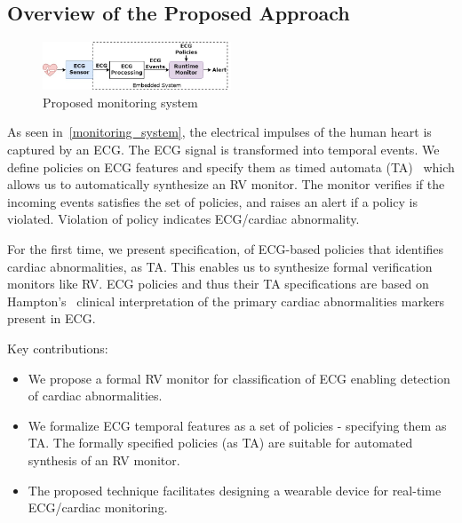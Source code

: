 \subsection{Overview of the Proposed Approach}

\begin{figure}
	\centering
	\includegraphics[width=0.5\textwidth]{Images/overview} 
	\caption{Proposed monitoring system}
	\label{monitoring_system}
\end{figure}


As seen in~\autoref{monitoring_system}, the electrical impulses of the human heart is captured by an ECG. The ECG signal is transformed into temporal events. We define policies on ECG features and specify them as timed automata (TA)~\cite{alur1994theory} which allows us to automatically synthesize an RV monitor. The monitor verifies if the incoming events satisfies the set of policies, and raises an alert if a policy is violated. Violation of policy indicates ECG/cardiac abnormality.

For the first time, we present specification, of ECG-based policies that identifies cardiac abnormalities, as TA. This enables us to synthesize formal verification monitors like RV. ECG policies and thus their TA specifications are based on Hampton's~\cite{hampton2019ecg} clinical interpretation of the primary cardiac abnormalities markers present in ECG.


Key contributions:
\begin{itemize}
	\item We propose a formal RV monitor for classification of ECG
	enabling detection of cardiac abnormalities.
	\item We formalize ECG temporal features as a set of policies - specifying them as TA. The formally specified policies (as TA) are suitable for automated synthesis of an RV monitor.
	\item The proposed technique facilitates designing a wearable device for real-time ECG/cardiac monitoring.
	
	
\end{itemize}